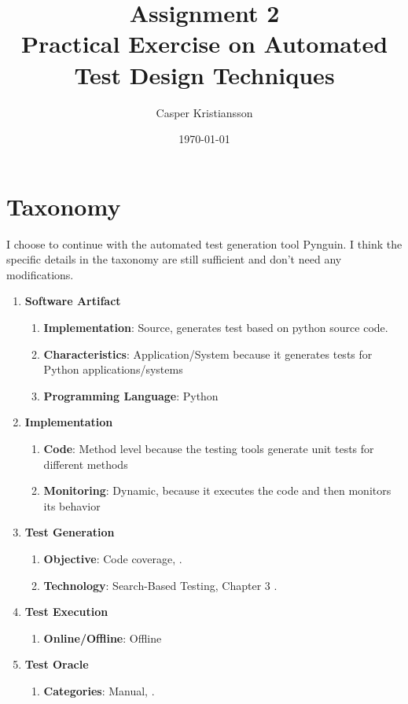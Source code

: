 \documentclass{article}
\title{Assignment 2\\Practical Exercise on Automated Test Design Techniques}
\author{Casper Kristiansson}
\date{\today}
\begin{document}
\maketitle

\section{Taxonomy}
I choose to continue with the automated test generation tool Pynguin. I think the specific details in the taxonomy are still sufficient and don't need any modifications.

\begin{enumerate}
    \item \textbf{Software Artifact}
    \begin{enumerate}
        \item \textbf{Implementation}: Source, generates test based on python source code.
        \item \textbf{Characteristics}: Application/System because it generates tests for Python applications/systems
        \item \textbf{Programming Language}: Python
    \end{enumerate}
    \item \textbf{Implementation}
    \begin{enumerate}
        \item \textbf{Code}: Method level because the testing tools generate unit tests for different methods
        \item \textbf{Monitoring}: Dynamic, because it executes the code and then monitors its behavior
    \end{enumerate}
    \item \textbf{Test Generation}
    \begin{enumerate}
        \item \textbf{Objective}: Code coverage,  \cite{lukasczyk2020automated}.
        \item \textbf{Technology}: Search-Based Testing, Chapter 3 \cite{lukasczyk2020automated}.
    \end{enumerate}
    \item \textbf{Test Execution}
    \begin{enumerate}
        \item \textbf{Online/Offline}: Offline
    \end{enumerate}
    \item \textbf{Test Oracle}
    \begin{enumerate}
        \item \textbf{Categories}: Manual,  \cite{lukasczyk2020automated}.
    \end{enumerate}
\end{enumerate}
\end{document}

